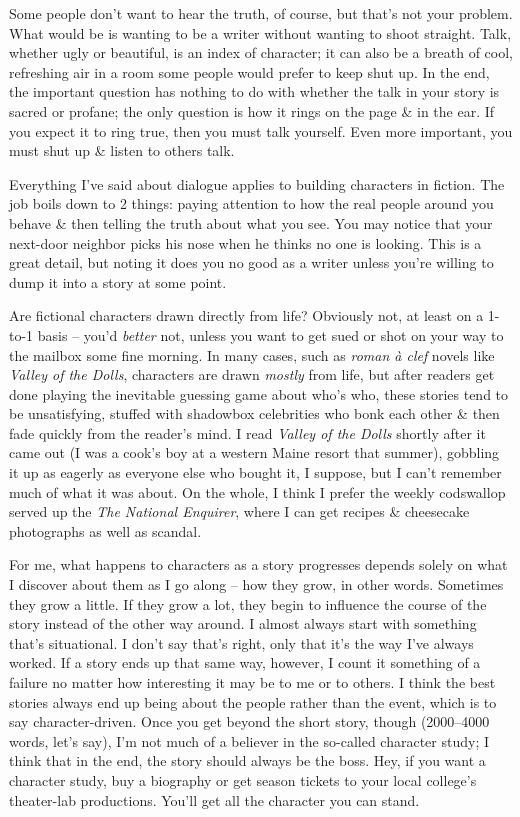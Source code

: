 \documentclass{article}
\numberwithin{equation}{section}
\begin{document}
Some people don't want to hear the truth, of course, but that's not your problem. What would be is wanting to be a writer without wanting to shoot straight. Talk, whether ugly or beautiful, is an index of character; it can also be a breath of cool, refreshing air in a room some people would prefer to keep shut up. In the end, the important question has nothing to do with whether the talk in your story is sacred or profane; the only question is how it rings on the page \& in the ear. If you expect it to ring true, then you must talk yourself. Even more important, you must shut up \& listen to others talk.

 Everything I've said about dialogue applies to building characters in fiction. The job boils down to 2 things: paying attention to how the real people around you behave \& then telling the truth about what you see. You may notice that your next-door neighbor picks his nose when he thinks no one is looking. This is a great detail, but noting it does you no good as a writer unless you're willing to dump it into a story at some point.

Are fictional characters drawn directly from life? Obviously not, at least on a 1-to-1 basis -- you'd \textit{better} not, unless you want to get sued or shot on your way to the mailbox some fine morning. In many cases, such as \textit{roman \`a clef} novels like \textit{Valley of the Dolls}, characters are drawn \textit{mostly} from life, but after readers get done playing the inevitable guessing game about who's who, these stories tend to be unsatisfying, stuffed with shadowbox celebrities who bonk each other \& then fade quickly from the reader's mind. I read \textit{Valley of the Dolls} shortly after it came out (I was a cook's boy at a western Maine resort that summer), gobbling it up as eagerly as everyone else who bought it, I suppose, but I can't remember much of what it was about. On the whole, I think I prefer the weekly codswallop served up the \textit{The National Enquirer}, where I can get recipes \& cheesecake photographs as well as scandal.

For me, what happens to characters as a story progresses depends solely on what I discover about them as I go along -- how they grow, in other words. Sometimes they grow a little. If they grow a lot, they begin to influence the course of the story instead of the other way around. I almost always start with something that's situational. I don't say that's right, only that it's the way I've always worked. If a story ends up that same way, however, I count it something of a failure no matter how interesting it may be to me or to others. I think the best stories always end up being about the people rather than the event, which is to say character-driven. Once you get beyond the short story, though (2000--4000 words, let's say), I'm not much of a believer in the so-called character study; I think that in the end, the story should always be the boss. Hey, if you want a character study, buy a biography or get season tickets to your local college's theater-lab productions. You'll get all the character you can stand.
\end{document}
